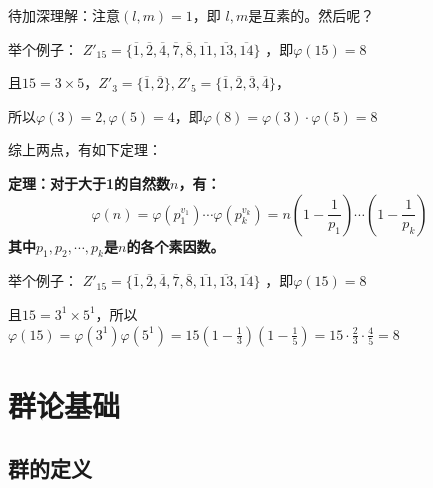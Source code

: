 \documentclass[12pt]{article}
\begin{document}
\begin{framed}
\small{
待加深理解：注意$(l,m)=1$，即 $l,m$是互素的。然后呢？

举个例子：
$Z'_{15} = \{\overline{1}, \overline{2}, \overline{4}, \overline{7}, \overline{8}, \overline{11}, \overline{13}, \overline{14}\}$
，即$\varphi(15) = 8$

且$15 = 3 \times 5$，$Z'_3 = \{\overline{1}, \overline{2}\}, Z'_5 = \{\overline{1}, \overline{2}, \overline{3}, \overline{4}\}$，

所以$\varphi(3) = 2, \varphi(5) = 4$，即$\varphi(8) = \varphi(3) \cdot  \varphi(5) = 8$
}
\end{framed}

综上两点，有如下定理：
\begin{mdframed}[
linecolor=black!40,outerlinewidth=1pt,roundcorner=.5em,innertopmargin=1ex,innerbottommargin=.5\baselineskip,innerrightmargin=1em,innerleftmargin=1em,backgroundcolor=gray!5,
]
\textbf{
定理：对于大于1的自然数$n$，有：
$$
\varphi(n) = \varphi(p_1^{v_1})\cdots\varphi(p_k^{v_k}) = n(1-\frac{1}{p_1})\cdots(1-\frac{1}{p_k})
$$
其中$p_1, p_2, \cdots, p_k$是$n$的各个素因数。
}
\end{mdframed}

\begin{framed}
\small{
举个例子：
$Z'_{15} = \{\overline{1}, \overline{2}, \overline{4}, \overline{7}, \overline{8}, \overline{11}, \overline{13}, \overline{14}\}$
，即$\varphi(15) = 8$

且$15 = 3^1 \times 5^1$，所以$\varphi(15) = \varphi(3^1)\varphi(5^1) = 15(1-\frac{1}{3})(1-\frac{1}{5}) = 15
\cdot \frac{2}{3} \cdot \frac{4}{5} = 8$
}
\end{framed}

\section{群论基础}
\subsection{群的定义}
\end{document}
